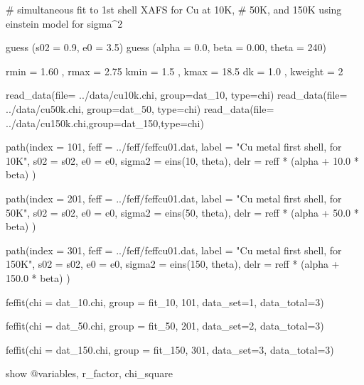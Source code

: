 {\small{
\begin{VerbSBox}
# simultaneous fit to 1st shell XAFS for Cu at 10K, 
# 50K, and 150K using einstein model for sigma^2

guess (s02     = 0.9, e0   = 3.5)
guess (alpha   = 0.0, beta = 0.00, theta   = 240)

rmin    = 1.60    , rmax    = 2.75
kmin    = 1.5     , kmax    = 18.5   
dk      = 1.0     , kweight = 2      

read_data(file= ../data/cu10k.chi, group=dat_10, type=chi)
read_data(file= ../data/cu50k.chi, group=dat_50, type=chi)
read_data(file= ../data/cu150k.chi,group=dat_150,type=chi)
 
path(index  = 101, feff   = ../feff/feffcu01.dat, 
     label  = "Cu metal first shell, for 10K", 
     s02    = s02,  e0 = e0, 
     sigma2 = eins(10, theta), 
     delr   = reff * (alpha + 10.0 * beta) )
 
path(index  = 201, feff   = ../feff/feffcu01.dat, 
     label  = "Cu metal first shell, for 50K", 
     s02    = s02,  e0 = e0, 
     sigma2 = eins(50, theta), 
     delr   = reff * (alpha + 50.0 * beta) )
 
path(index  = 301, feff   = ../feff/feffcu01.dat, 
     label  = "Cu metal first shell, for 150K", 
     s02    = s02,  e0 = e0, 
     sigma2 = eins(150, theta), 
     delr   = reff * (alpha + 150.0 * beta) )


feffit(chi = dat_10.chi,  group = fit_10,  101,
       data_set=1, data_total=3)

feffit(chi = dat_50.chi,  group = fit_50,  201,
       data_set=2, data_total=3)

feffit(chi = dat_150.chi, group = fit_150, 301,
       data_set=3, data_total=3)
 
show @variables, r_factor, chi_square
\end{VerbSBox}
}}\noindent 

